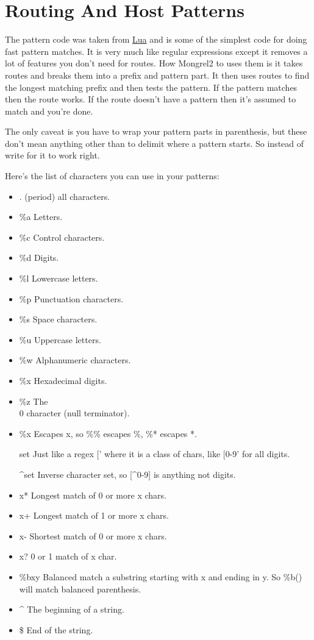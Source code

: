 \section{Routing And Host Patterns}

The pattern code was taken from \href{http://www.lua.org/}{Lua} and is some of the simplest 
code for doing fast pattern matches.  It is very much like regular expressions except it removes
a lot of features you don't need for routes.  How Mongrel2 to uses them is it takes routes and breaks
them into a prefix and pattern part.  It then uses routes to find the longest matching prefix and then
tests the pattern.  If the pattern matches then the route works.  If the route doesn't have a pattern
then it's assumed to match and you're done.

The only caveat is you have to wrap your pattern parts in parenthesis, but these don't mean anything
other than to delimit where a pattern starts.  So instead of  write 
for it to work right.

Here's the list of characters you can use in your patterns:

\begin{itemize}
\item . (period) all characters.
\item \%a Letters.
\item \%c Control characters.
\item \%d Digits.
\item \%l Lowercase letters.
\item \%p Punctuation characters.
\item \%s Space characters.
\item \%u Uppercase letters.
\item \%w Alphanumeric characters.
\item \%x Hexadecimal digits.
\item \%z The \\0 character (null terminator).
\item \%x Escapes x, so \%\% escapes \%, \%* escapes *.
\item [set] Just like a regex [' where it is a class of chars, like [0-9' for all digits.
\item [^set] Inverse character set, so [^0-9] is anything not digits.
\item x* Longest match of 0 or more x chars.
\item x+ Longest match of 1 or more x chars.
\item x- Shortest match of 0 or more x chars.
\item x? 0 or 1 match of x char.
\item \%bxy Balanced match a substring starting with x and ending in y.  So \%b() will match balanced parenthesis.
\item ^ The beginning of a string.
\item \$ End of the string.
\end{itemize}

